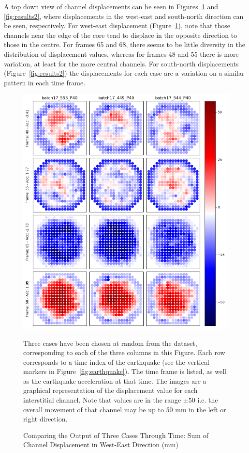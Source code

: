 \noindent
A top down view of channel displacements can be seen in Figures~\ref{fig:results1}
and \ref{fig:results2}, where displacements in the west-east and south-north direction can be seen, respectively. For west-east displacement (Figure~\ref{fig:results1}), note that those channels near the edge of the core tend to displace in the opposite direction to those in the centre. For frames 65 and 68, there seems to be little diversity in the distribution of displacement values, whereas for frames 48 and 55 there is more variation, at least for the more central channels. For south-north displacements (Figure~\ref{fig:results2}) the displacements for each case are a variation on a similar pattern in each time frame.
\\

\begin{figure}[p]
	\centering
	\includegraphics[scale=0.45]{Figures/results1.png}
	\caption{Comparing the Output of Three Cases Through Time: Sum of Channel Displacement in West-East Direction (mm) } { Three cases have been chosen at random from the dataset, corresponding to each of the three columns in this Figure. Each row corresponds to a time index of the earthquake (see the vertical markers in Figure~\ref{fig:earthquake}). The time frame is listed, as well as the earthquake acceleration at that time. The images are a graphical representation of the displacement value for each interstitial channel. Note that values are in the range $ \pm 50 $ i.e. the overall movement of that channel may be up to 50 mm in the left or right direction.}
	\label{fig:results1}
\end{figure}

